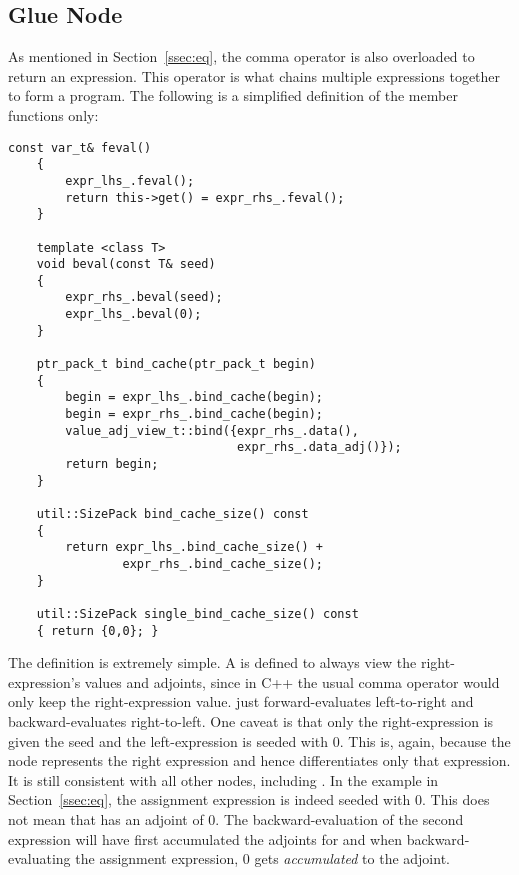 \subsection{Glue Node}\label{ssec:glue}

As mentioned in Section~\ref{ssec:eq},
the comma operator is also overloaded to return an expression.
This operator is what chains multiple expressions together to form a program.
The following is a simplified definition of the member functions only:
\begin{lstlisting}[style=customcpp]
    const var_t& feval()
    {
        expr_lhs_.feval(); 
        return this->get() = expr_rhs_.feval();
    }

    template <class T>
    void beval(const T& seed)
    {
        expr_rhs_.beval(seed); 
        expr_lhs_.beval(0);
    }

    ptr_pack_t bind_cache(ptr_pack_t begin)
    {
        begin = expr_lhs_.bind_cache(begin);
        begin = expr_rhs_.bind_cache(begin);
        value_adj_view_t::bind({expr_rhs_.data(), 
                                expr_rhs_.data_adj()});
        return begin;
    }

    util::SizePack bind_cache_size() const 
    { 
        return expr_lhs_.bind_cache_size() + 
                expr_rhs_.bind_cache_size();
    }

    util::SizePack single_bind_cache_size() const
    { return {0,0}; }
\end{lstlisting}
The definition is extremely simple.
A  is defined to always view the right-expression's values and adjoints,
since in C++ the usual comma operator would only keep the right-expression value.
 just forward-evaluates left-to-right and  backward-evaluates right-to-left.
One caveat is that only the right-expression is given the seed and the left-expression is seeded with 0.
This is, again, because the node represents the right expression and hence differentiates only that expression.
It is still consistent with all other nodes, including .
In the example in Section~\ref{ssec:eq}, the assignment expression is indeed seeded with 0.
This does not mean that  has an adjoint of 0.
The backward-evaluation of the second expression will have first accumulated the adjoints for 
and when backward-evaluating the assignment expression, 0 gets \emph{accumulated} to the adjoint.
